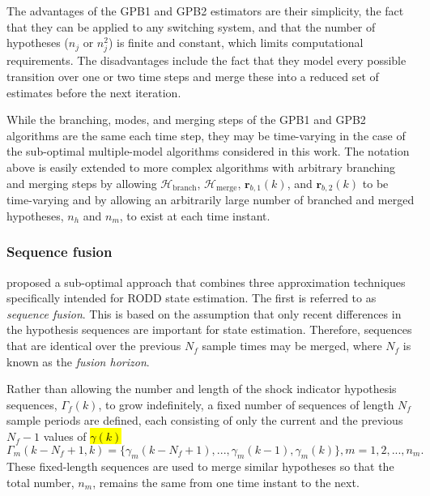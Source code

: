 {The advantages of the \gls{GPB1} and \gls{GPB2} estimators are their simplicity, the fact that they can be applied to any switching system, and that the number of hypotheses ($n_j$ or $n_j^2$) is finite and constant, which limits computational requirements. The disadvantages include the fact that they model every possible transition over one or two time steps and merge these into a reduced set of estimates before the next iteration. 

While the branching, modes, and merging steps of the \gls{GPB1} and \gls{GPB2} algorithms are the same each time step, they may be time-varying in the case of the sub-optimal multiple-model algorithms considered in this work. The notation above is easily extended to more complex algorithms with arbitrary branching and merging steps by allowing $\mathcal{H}_{\text{branch}}$, $\mathcal{H}_{\text{merge}}$, $\mathbf{r}_{b,1}(k)$, and $\mathbf{r}_{b,2}(k)$ to be time-varying and by allowing an arbitrarily large number of branched and merged hypotheses, $n_h$ and $n_m$, to exist at each time instant.

\subsubsection{Sequence fusion} \label{sec:fusion}

\cite{robertson_detection_1995} proposed a sub-optimal approach that combines three approximation techniques specifically intended for \gls{RODD} state estimation. The first is referred to as \textit{sequence fusion}. This is based on the assumption that only recent differences in the hypothesis sequences are important for state estimation. Therefore, sequences that are identical over the previous $N_f$ sample times may be merged, where $N_f$ is known as the \textit{fusion horizon}.
%

Rather than allowing the number and length of the shock indicator hypothesis sequences, $\Gamma_f(k)$, to grow indefinitely, a fixed number of sequences of length $N_f$ sample periods are defined, each consisting of only the current and the previous $N_f-1$ values of \hl{$\gamma(k)$}
%
\begin{equation} \label{eq:Gamma_kmf_k}
	\Gamma_m(k-N_f+1,k) = \{\gamma_m(k-N_f+1), ...,  \gamma_m(k-1), \gamma_m(k)\}, m=1,2,..., n_m.
\end{equation}
These fixed-length sequences are used to merge similar hypotheses so that the total number, $n_m$, remains the same from one time instant to the next.

}
